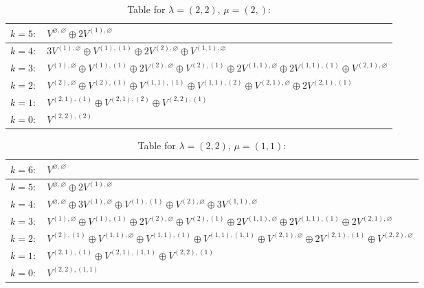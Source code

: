\documentclass[a4paper,12pt]{article}
\begin{document}
\renewcommand{\arraystretch}{1.6} 
\begin{table}[H]
\centering
\caption{Table for $\lambda = (2, 2)$, $\mu = (2,)$:}
\begin{tabular}{|>{\centering\arraybackslash}p{15cm}|}
\hline
 $k = 5: \quad V^{\varnothing, \varnothing} \oplus 2 V^{(1), \varnothing} $ \\ \hline
 $k = 4: \quad 3 V^{(1), \varnothing} \oplus V^{(1), (1)} \oplus 2 V^{(2), \varnothing} \oplus V^{(1, 1), \varnothing} $ \\ \hline
 $k = 3: \quad V^{(1), \varnothing} \oplus V^{(1), (1)} \oplus 2 V^{(2), \varnothing} \oplus V^{(2), (1)} \oplus 2 V^{(1, 1), \varnothing} \oplus 2 V^{(1, 1), (1)} \oplus V^{(2, 1), \varnothing} $ \\ \hline
 $k = 2: \quad V^{(2), \varnothing} \oplus V^{(2), (1)} \oplus V^{(1, 1), (1)} \oplus V^{(1, 1), (2)} \oplus V^{(2, 1), \varnothing} \oplus 2 V^{(2, 1), (1)} $ \\ \hline
 $k = 1: \quad V^{(2, 1), (1)} \oplus V^{(2, 1), (2)} \oplus V^{(2, 2), (1)} $ \\ \hline
 $k = 0: \quad V^{(2, 2), (2)} $ \\ \hline
\end{tabular}
\end{table}

\renewcommand{\arraystretch}{1.6} 
\begin{table}[H]
\centering
\caption{Table for $\lambda = (2, 2)$, $\mu = (1, 1)$:}
\begin{tabular}{|>{\centering\arraybackslash}p{15cm}|}
\hline
 $k = 6: \quad V^{\varnothing, \varnothing} $ \\ \hline
 $k = 5: \quad V^{\varnothing, \varnothing} \oplus 2 V^{(1), \varnothing} $ \\ \hline
 $k = 4: \quad V^{\varnothing, \varnothing} \oplus 3 V^{(1), \varnothing} \oplus V^{(1), (1)} \oplus V^{(2), \varnothing} \oplus 3 V^{(1, 1), \varnothing} $ \\ \hline
 $k = 3: \quad V^{(1), \varnothing} \oplus V^{(1), (1)} \oplus 2 V^{(2), \varnothing} \oplus V^{(2), (1)} \oplus 2 V^{(1, 1), \varnothing} \oplus 2 V^{(1, 1), (1)} \oplus 2 V^{(2, 1), \varnothing} $ \\ \hline
 $k = 2: \quad V^{(2), (1)} \oplus V^{(1, 1), \varnothing} \oplus V^{(1, 1), (1)} \oplus V^{(1, 1), (1, 1)} \oplus V^{(2, 1), \varnothing} \oplus 2 V^{(2, 1), (1)} \oplus V^{(2, 2), \varnothing} $ \\ \hline
 $k = 1: \quad V^{(2, 1), (1)} \oplus V^{(2, 1), (1, 1)} \oplus V^{(2, 2), (1)} $ \\ \hline
 $k = 0: \quad V^{(2, 2), (1, 1)} $ \\ \hline
\end{tabular}
\end{table}
\end{document}
